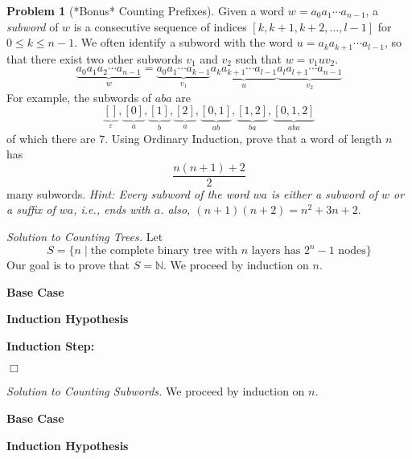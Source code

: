 \documentclass[11pt]{article}
\theoremstyle{theorem} %
\theoremstyle{definition} %
\newtheorem{problem}                    {{\color{BurntOrange}Problem}}
\theoremstyle{remark} %
\newcommand{\NN}{\mathbb{N}}                %
\begin{document}
\begin{problem}
    [*Bonus* Counting Prefixes]
    Given a word \(w = a_0a_1\cdots a_{n-1}\), a \emph{subword} of \(w\) is a consecutive sequence of indices \([k, k+1, k+ 2, \dots, l - 1]\) for \(0 \le k \le n-1\).
    We often identify a subword with the word \(u = a_{k}a_{k+1}\cdots a_{l-1}\), so that there exist two other subwords \(v_1\) and \(v_2\) such that \(w = v_1uv_2\).
    \[
        \underbrace{a_0 a_1 a_2 \cdots a_{n-1}}_{w}
        = \underbrace{a_0 a_1 \cdots a_{k-1}}_{v_1}
        \underbrace{a_{k} a_{k+1} \cdots a_{l-1}}_{u}
        \underbrace{a_{l} a_{l+1} \cdots a_{n-1}}_{v_2}
    \]
    For example, the subwords of \(aba\) are \[
        \underbrace{[]}_\varepsilon, 
        \underbrace{[0]}_{a},
        \underbrace{[1]}_{b},
        \underbrace{[2]}_{a},
        \underbrace{[0, 1]}_{ab},
        \underbrace{[1, 2]}_{ba},
        \underbrace{[0, 1, 2]}_{aba}
    \]
    of which there are \(7\).
    Using Ordinary Induction, prove that a word of length \(n\) has
    \[
        \frac{n(n+1) + 2}{2}
    \] 
    many subwords.
    \emph{Hint: Every subword of the word \(wa\) is either a subword of \(w\) or a suffix of \(wa\), i.e., ends with \(a\).
    also, \((n+1)(n+2) = n^2 + 3n + 2\)}.
\end{problem}

\pagebreak

\noindent\emph{Solution to Counting Trees.}
    Let \[
        S = \{n \mid \text{the complete binary tree with \(n\) layers has \(2^n - 1\) nodes}\}
    \]
    Our goal is to prove that \(S = \NN\).
    We proceed by induction on \(n\).
    \bigskip

    \noindent\textbf{Base Case}
    
    \vspace*{5em}

    \noindent\textbf{Induction Hypothesis}

    \vspace*{10em}

    \noindent\textbf{Induction Step:}
    
\vfill\hfill\(\Box\)
\pagebreak

\noindent\emph{Solution to Counting Subwords.}
    We proceed by induction on \(n\).
    \bigskip

    \noindent\textbf{Base Case}
    
    \vspace*{5em}

    \noindent\textbf{Induction Hypothesis}
\end{document}
